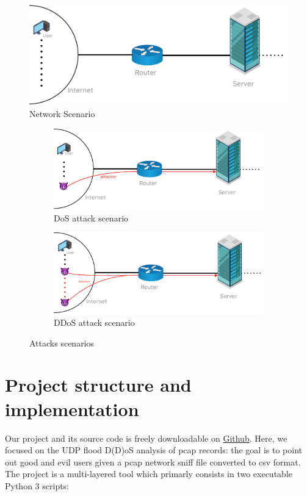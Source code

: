 \begin{figure}[ht]
  \includegraphics[scale=0.31]{imgs/scenario.png}
  \caption{Network Scenario}
  \label{fig:networkscenario}
\end{figure}

\begin{figure}[h]
	\begin{subfigure}{0.48\textwidth}
		\includegraphics[width=\textwidth]{imgs/DoS_attack.png}
		\caption{DoS attack scenario} \label{fig:DoS}
	\end{subfigure}
	\hspace*{\fill} %
	\begin{subfigure}{0.48\textwidth}
		\includegraphics[width=\textwidth]{imgs/DDoS_attack.png}
		\caption{DDoS attack scenario} \label{fig:DDoS}
	\end{subfigure}
	\caption{Attacks scenarios}
	\label{fig:atks}
\end{figure}

\section{Project structure and implementation}
Our project and its source code is freely downloadable on \href{https://github.com/CristianTuretta/DDoS-Network-Flow-Forensics-Analyser-.git}{Github}. Here, we focused on the UDP flood D(D)oS analysis of pcap records: the goal is to point out good and evil users given a pcap network sniff file converted to csv format. The project is a multi-layered tool which primarly consists in two executable Python 3 scripts:

